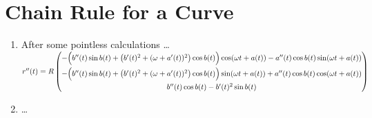 \documentclass{article}
\begin{document}
\section{Chain Rule for a Curve}
\begin{enumerate}
    \item After some pointless calculations \dots \\
    $r''(t) = R\begin{pmatrix} -\Bigl(b''(t)\sin b(t) + \bigl(b'(t)^2+(\omega+a'(t))^2\bigr)\cos b(t)\Bigr)\cos(\omega t+a(t)) - a''(t)\cos b(t)\sin(\omega t+a(t)) \\[6pt] -\Bigl(b''(t)\sin b(t) + \bigl(b'(t)^2+(\omega+a'(t))^2\bigr)\cos b(t)\Bigr)\sin(\omega t+a(t)) + a''(t)\cos b(t)\cos(\omega t+a(t)) \\[6pt] b''(t)\cos b(t) - b'(t)^2\sin b(t) \end{pmatrix}$
    
    \item \dots
\end{enumerate}
\end{document}
